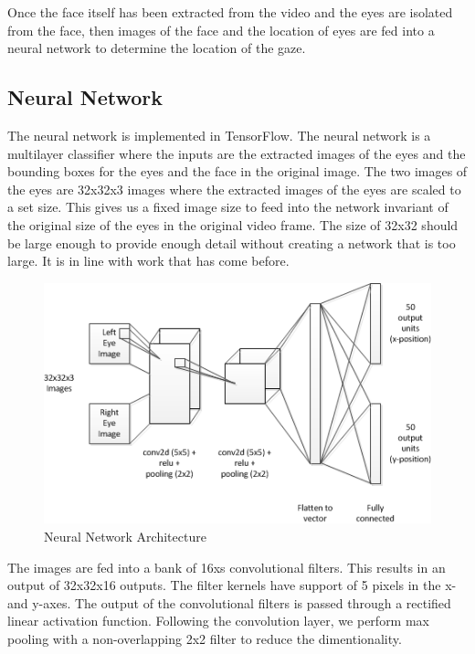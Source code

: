 \documentclass[10pt,twocolumn,letterpaper]{article}
\begin{document}
Once the face itself has been extracted from the video and the eyes
are isolated from the face, then images  of the face and the location
of eyes are fed into a neural network to determine the location of the
gaze.


\subsection{Neural Network}
The neural network is implemented in TensorFlow. The neural network is
a multilayer classifier where the inputs are the extracted images of
the eyes and the bounding boxes for the eyes and the face in the
original image. The two images of the eyes are 32x32x3 images where
the extracted images of the eyes are scaled to a set size. This gives
us a fixed image size to feed into the network invariant of the
original size of the eyes in the original video frame. The size of
32x32 should be large enough to provide enough detail without creating
a network that is too large. It is in line with work that has come
before.

\begin{figure}
  \begin{center}
    \includegraphics[width=\linewidth]{gaze-tracking-cnn-arch}
  \end{center}
  \caption{Neural Network Architecture}
  \label{fig.cnn-arch}
\end{figure}


The images are fed into a bank of 16xs convolutional
filters. This results in an output of 32x32x16 outputs. The filter
kernels have support of 5 pixels in the x- and y-axes. The output of
the convolutional filters is passed through a rectified linear
activation function. Following the convolution layer, we perform max pooling with a
non-overlapping 2x2 filter to reduce the dimentionality.
\end{document}

